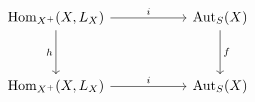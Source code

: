 \[
\begin{tikzcd}[column sep=5.5em, row sep=3.2em]
 \operatorname{Hom}_{X^+}(X,L_X)
   \arrow[r,"i"]
   \arrow[d,"h"']
 &
 \operatorname{Aut}_S(X)
   \arrow[d,"f"]
 \\
 \operatorname{Hom}_{X^+}(X,L_X)
   \arrow[r,"i"]
 &
 \operatorname{Aut}_S(X)
\end{tikzcd}
\]
